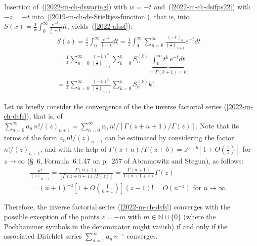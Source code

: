 {Insertion of~(\ref{2022-m-ch-dswaring})
with $w = -t$ and~(\ref{2022-m-ch-dsifps22})
with $-z = -t$
into~(\ref{2019-m-ch-ds-Stieltjes-function}), that is, into $S(x)   =  \frac{1}{x}  \int_0^\infty    \frac{e^{-t}}{\frac{1}{x}+t} dt$, yields~(\ref{2022-afssf}):
\begin{equation}
\begin{split}
S(z)
= \frac{1}{z}  \int_0^\infty    \frac{e^{-t}}{\frac{1}{z}+t} dt
= \frac{1}{z}  \int_0^\infty  \sum_{n=0}^\infty  \frac{(-t)_n}{\left(\frac{1}{z}\right )_{n+1}} e^{-t} dt
\\
= \frac{1}{z}  \sum_{n=0}^\infty  \frac{(-1)^n }{\left(\frac{1}{z}\right )_{n+1}}   \sum_{k=0}^n  {S}_n^{(k)} \underbrace{\int_0^\infty  t^k  \, e^{-t} dt}_{=\Gamma(k+1)=k!}
\\
=\frac{1}{z} \sum_{n=0}^\infty \frac{(-1)^n}{\left(\frac{1}{z}\right)_{n+1}} \sum_{k=0}^n {S}_n^{(k)} k!
.
\end{split}
\label{2022-m-ch-dsafssf}
\end{equation}

\bproof
}

Let us briefly consider the convergence of the
the  inverse factorial series (\ref{2022-m-ch-dsfs}), that is, of
$\sum_{n=0}^\infty  a_n \,{n!}/{(z)_{n+1}}= \sum_{n=0}^\infty  a_n \, {n!}/{\left[\Gamma(z+n+1)/\Gamma(z)\right]}$.
Note that its terms of the form $a_n {n!}/{(z)_{n+1}}$
can be estimated by considering the factor  ${n!}/{(z)_{n+1}}$, and with the help of
$\Gamma(z+a)/\Gamma(z+b)= z^{a-b}\left[1 + O\left(\frac{1}{z}\right) \right]$ for $z\rightarrow \infty$
({\S}~6, Formula~6.1.47  on p.~257  of Abramowitz and Stegun),%
as follows:
\begin{equation}
\begin{split}
\frac{n!}{(z)_{n+1}}
= \frac{\Gamma(n+1)}{\left[\Gamma(z+n+1)/\Gamma(z)\right]}
= \frac{\Gamma(n+1)}{\Gamma(n+1+z)} \Gamma(z)  \\
= (n+1)^{-z}\left[1 + O\left(\frac{1}{n+1}\right) \right](z-1)!
= O \left( n^{-z} \right) \text{ for } n \rightarrow \infty.
\end{split}
\label{2022-m-ch-estimate}
\end{equation}

Therefore, the  inverse factorial series (\ref{2022-m-ch-dsfs})
converges with the possible
exception of the points $z =-m$ with $m \in   \mathbb{N} \cup \{0\}$
(where the Pochhammer symbols in the denominator might vanish)
if and only if the associated Dirichlet series
$\sum_{n=1}^\infty a_n \, n^{-z}$
converges.

